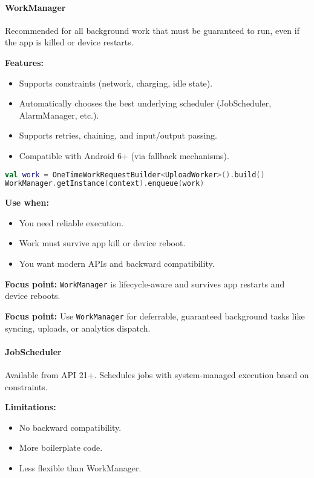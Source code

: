 \documentclass[a4paper,12pt]{article}
\begin{document}
\paragraph{WorkManager}
Recommended for all background work that must be guaranteed to run, even if the app is killed or device restarts.

\textbf{Features:}
\begin{itemize}
  \item Supports constraints (network, charging, idle state).
  \item Automatically chooses the best underlying scheduler (JobScheduler, AlarmManager, etc.).
  \item Supports retries, chaining, and input/output passing.
  \item Compatible with Android 6+ (via fallback mechanisms).
\end{itemize}

\begin{lstlisting}[language=Kotlin]
val work = OneTimeWorkRequestBuilder<UploadWorker>().build()
WorkManager.getInstance(context).enqueue(work)
\end{lstlisting}

\textbf{Use when:}
\begin{itemize}
  \item You need reliable execution.
  \item Work must survive app kill or device reboot.
  \item You want modern APIs and backward compatibility.
\end{itemize}

\textbf{Focus point:} \texttt{WorkManager} is lifecycle-aware and survives app restarts and device reboots.

\textbf{Focus point:} Use \texttt{WorkManager} for deferrable, guaranteed background tasks like syncing, uploads, or analytics dispatch.

\paragraph{JobScheduler}

Available from API 21+. Schedules jobs with system-managed execution based on constraints.

\textbf{Limitations:}
\begin{itemize}
  \item No backward compatibility.
  \item More boilerplate code.
  \item Less flexible than WorkManager.
\end{itemize}
\end{document}
